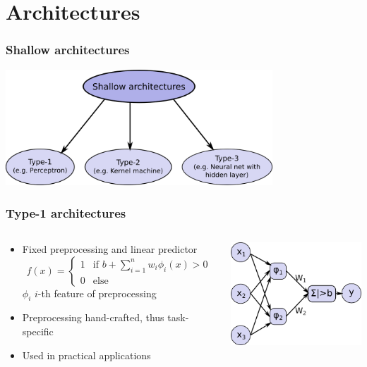 \section{Architectures}

\begin{frame}
	\frametitle{Shallow architectures}
	\includegraphics[width=10cm]{images/architectures.png}
\end{frame}

\begin{frame}
	\frametitle{Type-1 architectures}
	\begin{columns}
		\begin{column}{6.5cm}
			\begin{itemize}
				\item Fixed preprocessing and linear predictor
				\begin{displaymath}
					f(x)= \begin{cases}
						1& \text{if } b + \sum_{i=1}^{n}w_i \phi_i(x) > 0\\
						0& \text{else}
					\end{cases}
				\end{displaymath}
				$\phi_{i}$ $i$-th feature of preprocessing
				\item Preprocessing hand-crafted, thus task-specific
				\item Used in practical applications
			\end{itemize}
		\end{column}
		\begin{column}{5cm}
			\includegraphics[width=5cm]{images/perceptron.png}
		\end{column}
	\end{columns}
\end{frame}

